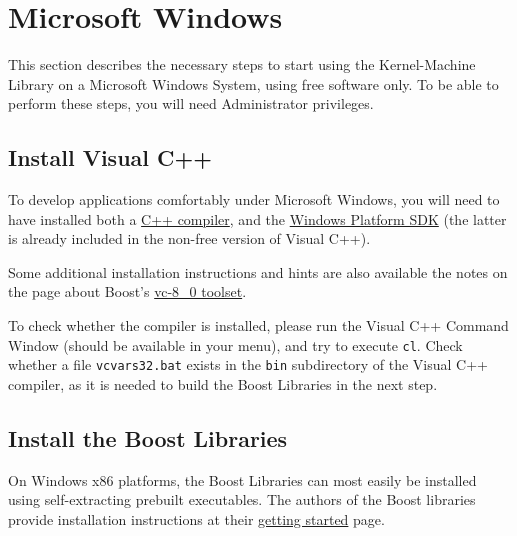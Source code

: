 \documentclass{article}
\begin{document}
\section{Microsoft Windows}

This section describes the necessary steps to start using 
the Kernel-Machine Library on a Microsoft Windows System, 
using free software only. To be able to perform these
steps, you will need Administrator privileges.

\subsection{Install Visual C++}

To develop applications comfortably under Microsoft Windows, you will need
to have installed both a \href{http://msdn.microsoft.com/vstudio/express/visualc/}{C++ compiler},
and the 
\href{http://msdn.microsoft.com/vstudio/express/visualc/usingpsdk/}{Windows Platform SDK} (the latter is
already included in the non-free version of Visual C++).

Some additional installation instructions and hints are also available the notes
on the page about Boost's
\href{http://www.boost.org/tools/build/v1/vc-8_0-tools.html}{vc-8_0 toolset}.

To check whether the compiler is installed, please run the Visual C++ Command Window (should be 
available in your menu), and try to execute \texttt{cl}. Check whether 
a file \texttt{vcvars32.bat} exists in the \texttt{bin} subdirectory of the Visual
C++ compiler, as it is needed to build the Boost Libraries in the next step.

\subsection{Install the Boost Libraries}

On Windows x86 platforms, the Boost Libraries can most easily 
be installed using self-extracting prebuilt executables.
The authors of the Boost libraries provide installation instructions at 
their \href{http://www.boost.org/more/getting_started.html}{getting started} page.
\end{document}
